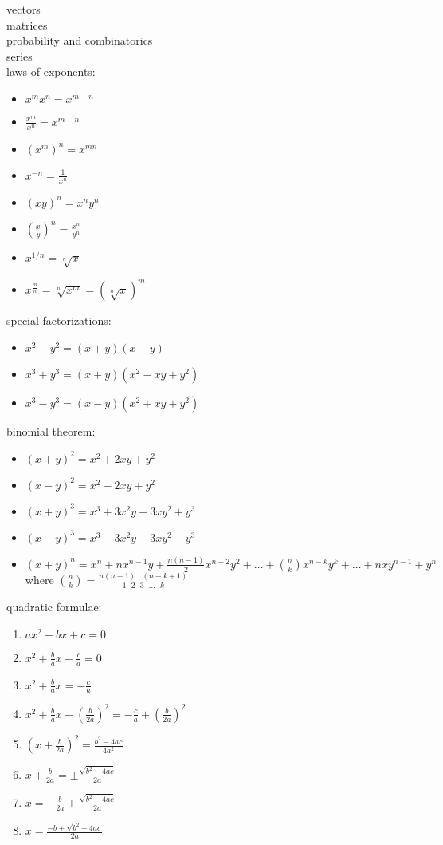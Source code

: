 \documentclass{article}
\begin{document}
vectors\\

matrices\\

probability and combinatorics\\

series\\

laws of exponents: 
	\begin{itemize}
		\item $x^mx^n = x^{m+n}$
		\item $\frac{x^m}{x^n} = x^{m-n}$
		\item $(x^m)^n = x^{mn}$
		\item $x^{-n} = \frac{1}{x^n}$
		\item $(xy)^n = x^ny^n$
		\item $(\frac{x}{y})^n = \frac{x^n}{y^n}$ \item $x^{1/n} = \sqrt[n]{x}$
		\item $x^{\frac{m}{n}} = \sqrt[n]{x^m} = (\sqrt[n]{x})^m$
	\end{itemize}

special factorizations:
	\begin{itemize}
		\item $x^2 - y^2 = (x + y)(x - y)$
		\item $x^3 + y^3 = (x + y)(x^2 - xy + y^2)$
		\item $x^3 - y^3 = (x - y)(x^2 + xy + y^2)$
	\end{itemize}

binomial theorem:
	\begin{itemize}
		\item $(x + y)^2 = x^2 + 2xy + y^2$
		\item $(x - y)^2 = x^2 - 2xy + y^2$
		\item $(x + y)^3 = x^3 + 3x^2y + 3xy^2 + y^3$
		\item $(x - y)^3 = x^3 - 3x^2y + 3xy^2 - y^3$
		\item $(x + y)^n = x^n + nx^{n-1}y + \frac{n(n-1)}{2}x^{n-2}y^2 + \ldots + \binom{n}{k}x^{n-k}y^k + \dots + nxy^{n-1} + y^n$
			where $\binom{n}{k} = \frac{n(n-1) \dots (n-k+1)}{1 \cdot 2 \cdot 3 \cdot \ldots \cdot k}$
	\end{itemize}

quadratic formulae:
	\begin{enumerate}
		\item $ax^2 + bx + c = 0$
		\item $x^2 + \frac{b}{a}x + \frac{c}{a} = 0$
		\item $x^2 + \frac{b}{a}x = -\frac{c}{a}$
		\item $x^2 + \frac{b}{a}x + \left( \frac{b}{2a} \right)^2 = -\frac{c}{a} + \left( \frac{b}{2a} \right)^2$
		\item $\left( x + \frac{b}{2a} \right)^2 = \frac{b^2 - 4ac}{4a^2}$
		\item $x + \frac{b}{2a} = \pm \frac{\sqrt{b^2 - 4ac}}{2a}$
		\item $x = -\frac{b}{2a} \pm \frac{\sqrt{b^2 - 4ac}}{2a}$
		\item $x = \frac{-b \pm \sqrt{b^2 - 4ac}}{2a}$
	\end{enumerate}
\end{document}
